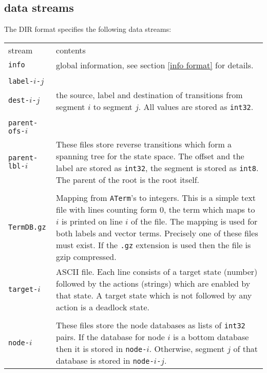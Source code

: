 \subsection{data streams}

The DIR format specifies the following data streams:
\par\noindent\begin{tabularx}{\textwidth}{@{}lX@{}}
stream & contents
\\
{\tt info} & global information, see section \ref{info format} for details.
\\
\begin{tabular}[t]{@{}l@{}}
{\tt src-$i$-$j$}\\
{\tt label-$i$-$j$}\\
{\tt dest-$i$-$j$}
\end{tabular}
& the source, label and destination of transitions from segment $i$ to segment $j$.
All values are stored as {\tt int32}.
\\
\begin{tabular}[t]{@{}l@{}}
{\tt parent-seg-$i$}\\
{\tt parent-ofs-$i$}\\
{\tt parent-lbl-$i$}
\end{tabular}
& These files store reverse transitions which form a spanning tree for the state space.
The offset and the label are stored as {\tt int32}, the segment is stored as {\tt int8}.
The parent of the root is the root itself.
\\
\begin{tabular}[t]{@{}l@{}}
{\tt TermDB}\\
{\tt TermDB.gz}
\end{tabular}
& Mapping from {\tt ATerm}'s to integers. This is a simple text file with lines counting form $0$, the
term which maps to $i$ is printed on line $i$ of the file. The mapping is used for both labels and vector terms.
Precisely one of these files must exist. If the {\tt .gz} extension is used then the file is gzip compressed.
\\
{\tt target-$i$}&
ASCII file. Each line consists of a target state (number) followed by the actions (strings) which are 
enabled by that state.
A target state which is not followed by any action is a deadlock state.
\\
\begin{tabular}[t]{@{}l@{}}
{\tt node-$i$-$j$}\\
{\tt node-$i$}
\end{tabular}
&
These files store the node databases as lists of {\tt int32} pairs.
If the database for node $i$ is a bottom database then it is stored in
{\tt node-$i$}. Otherwise, segment $j$ of that database is stored in {\tt node-$i$-$j$}.
\end{tabularx}

